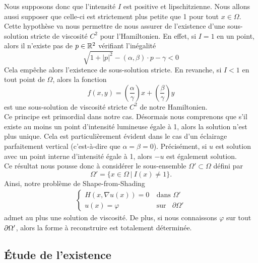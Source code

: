 Nous supposons donc que l'intensité $I$ est positive et lipschitzienne. Nous allons aussi supposer que celle-ci est strictement plus petite que 1 pour tout $x\in\Omega$. Cette hypothèse va nous permettre de nous assurer de l'existence d'une sous-solution stricte de viscosité $C^2$ pour l'Hamiltonien. En effet, si $I=1$ en un point, alors il n'existe pas de $p\in\mathbb{R}^2$ vérifiant l'inégalité 
\begin{equation*}
    \sqrt{1+{|p|}^2} - \left( \alpha, \beta \right) \cdot p - \gamma < 0
\end{equation*}
Cela empêche alors l'existence de sous-solution stricte. En revanche, si $I < 1$ en tout point de $\Omega$, alors la fonction 
\begin{equation*}
    f\left(x,y\right)=\left(\dfrac{\alpha}{\gamma}\right)x+\left(\dfrac{\beta}{\gamma}\right)y
\end{equation*}
est une sous-solution de viscosité stricte $C^2$ de notre Hamiltonien.\\



Ce principe est primordial dans notre cas. Désormais nous comprenons que s'il existe au moins un point d'intensité lumineuse égale à 1, alors la solution n'est plus unique. Cela est particulièrement évident dans le cas d'un éclairage parfaitement vertical (c'est-à-dire que $\alpha=\beta=0$). Précisément, si $u$ est solution avec un point interne d'intensité égale à 1, alors $-u$ est également solution.\\
Ce résultat nous pousse donc à considérer le sous-ensemble $\Omega' \subset \Omega$ défini par 
\begin{equation*}
    \Omega' = \{ x\in \Omega \ | \ I(x) \neq 1\}.
\end{equation*}
Ainsi, notre problème de Shape-from-Shading
\begin{align}
    \left\{\begin{array}{ll}
         H(x,\nabla u(x)) = 0& \ \text{dans } \Omega'\\  
         u(x)=\varphi& \ \text{sur } \mathop{}\!{\partial}\Omega'
    \end{array}
    \right.
\end{align}
admet au plus une solution de viscosité. De plus, si nous connaissons $\varphi$ sur tout $\mathop{}\!{\partial} \Omega'$, alors la forme à reconstruire est totalement déterminée.


\subsection{Étude de l'existence}

